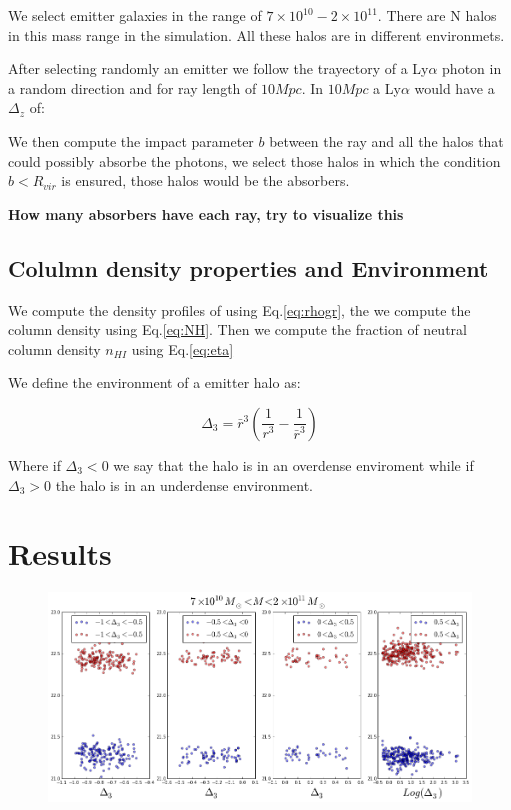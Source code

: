 \documentclass[12pt]{article}
\begin{document}
We select emitter galaxies in the range of $7 \times 10^{10} - 2 \times 10^{11}$.
There are N halos in this mass range in the simulation. All these halos
are in different environmets.  

After selecting randomly an emitter we follow the trayectory of a Ly$\alpha$ photon 
in a random direction and for ray length of $10 Mpc$. In $10 Mpc$ a Ly$\alpha$ would 
have a $\Delta_z$ of: 

We then compute the impact parameter $b$ between the ray and all the halos that could
possibly absorbe the photons, we select those halos in which the condition $b<R_{vir}$ 
is ensured, those halos would be the absorbers. 

\textbf{How many absorbers have each ray, try to visualize this}

\subsection{Colulmn density properties and Environment}

We compute the density profiles of using Eq.\ref{eq:rhogr}, the
we compute the column density using Eq.\ref{eq:NH}. Then we compute
the fraction of neutral column density $n_{HI}$ using Eq.\ref{eq:eta}

We define the environment of a emitter halo as:

\begin{equation}
\Delta_3  = \bar{r}^3 \left( \dfrac{1}{r^3} - \dfrac{1}{\bar{r}^3} \right)
\end{equation}

Where if $\Delta_3 < 0 $ we say that the halo is in an overdense enviroment while
if $\Delta_3 > 0 $ the halo is in an underdense environment.

\section{Results}

\begin{figure}[H]
\centering
\includegraphics[scale=0.4]{../figures/NHI.png}
\end{figure}
\end{document}
